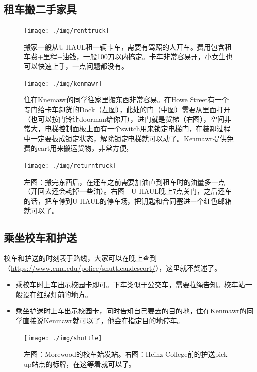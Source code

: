 \documentclass[letterpaper,10pt]{article}
\begin{document}
	\subsection{租车搬二手家具}
	
	\begin{figure}[!h]
		\centering
		\texttt{[image: ./img/renttruck]}
		\caption{搬家一般从U-HAUL租一辆卡车，需要有驾照的人开车。费用包含租车费+里程+油钱，一般100刀以内搞定。卡车非常容易开，小女生也可以快速上手，一点问题都没有。}
	\end{figure}
	
	\begin{figure}[!h]
		\centering
		\texttt{[image: ./img/kenmawr]}
		\caption{住在Knemawr的同学往家里搬东西非常容易。在Howe Street有一个专门给卡车卸货的Dock（左图），此处的门（中图）需要从里面打开（也可以按门铃让doorman给你开），进门就是货梯（右图），空间非常大，电梯控制面板上面有一个switch用来锁定电梯门，在装卸过程中一定要扳成锁定状态，解除锁定电梯就可以动了。Kenmawr提供免费的cart用来搬运货物，非常方便。}
	\end{figure}
	
	\begin{figure}[!h]
		\centering
		\texttt{[image: ./img/returntruck]}
		\caption{左图：搬完东西后，在还车之前需要加油直到租车时的油量多一点（开回去还会耗掉一些油）。右图：U-HAUL晚上7点关门，之后还车的话，把车停到U-HAUL的停车场，把钥匙和合同塞进一个红色邮箱就可以了。}
	\end{figure}
	
	\subsection{乘坐校车和护送}
	
	校车和护送的时刻表于路线，大家可以在晚上查到（\url{https://www.cmu.edu/police/shuttleandescort/}），这里就不赘述了。
	
	\begin{itemize}
		\item 乘校车时上车出示校园卡即可。下车类似于公交车，需要拉绳告知。校车站一般设在红绿灯前的地方。
		\item 乘坐护送时上车出示校园卡，同时告知自己要去的目的地，住在Kenmawr的同学直接说Kenmawr就可以了，他会在指定目的地停车。
	\end{itemize}
	
	\begin{figure}[!h]
		\centering
		\texttt{[image: ./img/shuttle]}
		\caption{左图：Morewood的校车始发站。右图：Heinz College前的护送pick up站点的标牌，在这等着就可以了。}
	\end{figure}
	
\end{document}
